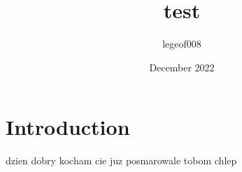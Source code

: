 \documentclass{article}
\title{test}
\author{legeof008 }
\date{December 2022}
\begin{document}
\maketitle

\section{Introduction}
dzien dobry kocham cie juz posmarowale tobom chlep
\end{document}
